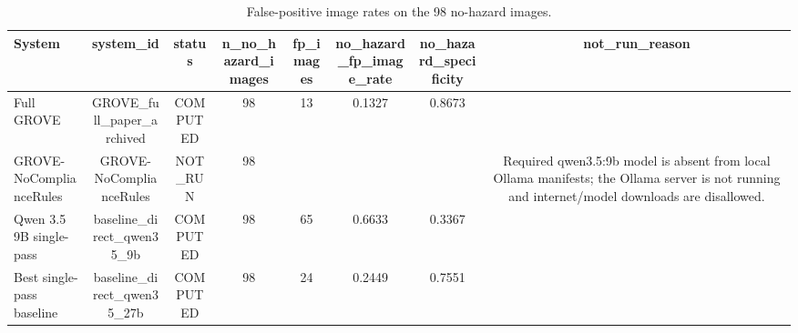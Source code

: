 \begin{table}[t]
\centering
\small
\caption{False-positive image rates on the 98 no-hazard images.}
\label{tab:compliance\_nohazard\_fp}
\begin{tabular}{lccccccc}
\toprule
System & system\_id & status & n\_no\_hazard\_images & fp\_images & no\_hazard\_fp\_image\_rate & no\_hazard\_specificity & not\_run\_reason \\
\midrule
Full GROVE & GROVE\_full\_paper\_archived & COMPUTED & 98 & 13 & 0.1327 & 0.8673 &  \\
GROVE-NoComplianceRules & GROVE-NoComplianceRules & NOT\_RUN & 98 &  &  &  & Required qwen3.5:9b model is absent from local Ollama manifests; the Ollama server is not running and internet/model downloads are disallowed. \\
Qwen 3.5 9B single-pass & baseline\_direct\_qwen35\_9b & COMPUTED & 98 & 65 & 0.6633 & 0.3367 &  \\
Best single-pass baseline & baseline\_direct\_qwen35\_27b & COMPUTED & 98 & 24 & 0.2449 & 0.7551 &  \\
\bottomrule
\end{tabular}
\end{table}

